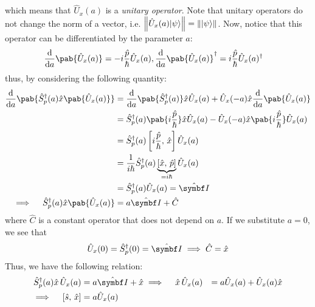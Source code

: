 which means that $\hat{U}_x(a)$ is a \emph{unitary operator}.
Note that unitary operators do not change the norm of a vector, i.e. $\left\lVert \hat{U}_x(a) \lvert\psi\rangle \right\rVert = \left\lVert \lvert\psi\rangle \right\rVert$.
Now, notice that this operator can be differentiated by the parameter $a$:
\begin{align}
  \odv{}{a} \pab{\hat{U}_x (a)} & = -i \frac{\hat{p}}{\hbar} \hat{U}_x (a), \odv{}{a} \pab{\hat{U}_x (a)}^\dagger = i \frac{\hat{p}}{\hbar} \hat{U}_x (a)^\dagger
\end{align}
thus, by considering the following quantity:
\begin{align}
  \odv{}{a} \pab{\hat{S}^\dagger_p (a) \hat{x} \pab{\hat{U}_x(a)}}
   & = \odv{}{a} \pab{\hat{S}^\dagger_p (a)} \hat{x} \hat{U}_x (a) + \hat{U}_x (-a) \hat{x} \odv{}{a} \pab{\hat{U}_x (a)}                             \\
   & = \hat{S}^\dagger_p (a) \pab{i \frac{\hat{p}}{\hbar}} \hat{x} \hat{U}_x (a) - \hat{U}_x (-a) \hat{x} \pab{i \frac{\hat{p}}{\hbar}} \hat{U}_x (a) \\
   & = \hat{S}^\dagger_p (a) \commt{i \frac{\hat{p}}{\hbar}}{\hat{x}} \hat{U}_x (a)                                                                   \\
   & = \frac{1}{i \hbar} \hat{S}^\dagger_p (a) \underbrace{\commt{\hat{x}}{\hat{p}}}_{= i \hbar} \hat{U}_x (a)                                        \\
   & = \hat{S}^\dagger_p (a) \hat{U}_x (a) = \idty                                                                                                    \\
  \implies \quad \hat{S}^\dagger_p (a) \hat{x} \pab{\hat{U}_x(a)}
   & = a \idty + \hat{C}
\end{align}
where $\hat{C}$ is a constant operator that does not depend on $a$.
If we substitute $a = 0$, we see that
\begin{align}
  \hat{U}_x (0) = \hat{S}^\dagger_p (0) = \idty \implies \hat{C} = \hat{x}
\end{align}
Thus, we have the following relation:
\begin{align}
  \hat{S}^\dagger_p (a) \hat{x} \, \hat{U}_x(a) & = a \idty + \hat{x}
  \implies \quad \hat{x} \, \hat{U}_x(a)        & = a \hat{U}_x(a) + \hat{U}_x(a) \hat{x} \\
  \implies \quad \commt{\hat{s}}{\hat{x}}       & = a \hat{U}_x(a)
\end{align}
